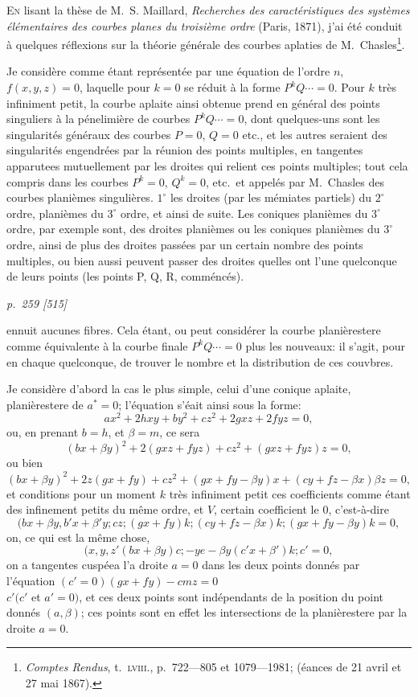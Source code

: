 \documentclass[11pt,a4paper]{article}
\theoremstyle{plain}
\theoremstyle{definition}
\begin{document}
\textsc{En} lisant la th\`ese de M.~S. Maillard, \textit{Recherches des caract\'eristiques des syst\`emes
\'el\'ementaires des courbes planes du troisi\`eme ordre} (Paris, 1871), j'ai \'et\'e conduit \`a
quelques r\'eflexions sur la th\'eorie g\'en\'erale des courbes aplaties de M.~Chasles\footnote{\textit{Comptes Rendus}, t.~\textsc{lviii.}, p.~722---805 et 1079---1981; (\'eances de 21 avril et 27 mai 1867).}.

Je consid\`ere comme \'etant repr\'esent\'ee par une \'equation de l'ordre $n$, $f(x, y, z) = 0$,
laquelle pour $k = 0$ se r\'eduit \`a la forme $P^kQ \cdots = 0$.  Pour $k$ tr\`es infiniment petit,
la courbe aplaite ainsi obtenue prend en g\'en\'eral des points singuliers \`a la p\'enelimi\`ere de
courbes $P^kQ \cdots = 0$, dont quelques-uns sont les singularit\'es g\'en\'eraux des courbes
$P = 0$, $Q = 0$ etc., et les autres seraient des singularit\'es engendr\'ees par la r\'eunion des
points multiples, en tangentes apparutees mutuellement par les droites qui relient ces
points multiples; tout cela compris dans les courbes $P^k = 0$, $Q^k = 0$, etc.\ et appel\'es par
M.~Chasles des courbes plani\`emes singuli\`eres.  $1^{\circ}$ les droites (par les m\'emiates partiels) du
$2^{\circ}$ ordre, plani\`emes du $3^{\circ}$ ordre, et ainsi de suite.  Les coniques plani\`emes du $3^{\circ}$ ordre,
par exemple sont, des droites plani\`emes ou les coniques plani\`emes du $3^{\circ}$ ordre, ainsi de plus
des droites pass\'ees par un certain nombre des points multiples, ou bien aussi peuvent
passer des droites quelles ont l'une quelconque de leurs points (les points P, Q, R, comm\'enc\'es).

\clearpage

\bigskip
\textit{p.~259 [515]}
\smallskip

\noindent
ennuit aucunes fibres.  Cela \'etant, ou peut consid\'erer la courbe plani\`erestere comme
\'equivalente \`a la courbe finale $P^kQ \cdots = 0$ plus les nouveaux: il s'agit, pour en
chaque quelconque, de trouver le nombre et la distribution de ces couvbres.

Je consid\`ere d'abord la cas le plus simple, celui d'une conique aplaite, plani\`erestere
de $a^* = 0$; l'\'equation s'\'eait ainsi sous la forme:
\[
ax^2 + 2hxy + by^2 + cz^2 + 2gxz + 2fyz = 0,
\]
ou, en prenant $b = h$, et $\beta = m$, ce sera
\[
(bx + \beta y)^2 + 2(gxz + fyz) + c z^2 + (gxz + fyz)z = 0,
\]
ou bien
\[
(bx + \beta y)^2 + 2z(gx + fy) + cz^2 + (gx + fy - \beta y)x + (cy + fz - \beta x)\beta z = 0,
\]
et conditions pour un moment $k$ tr\`es infiniment petit ces coefficients comme \'etant des infinement
petits du m\^eme ordre, et $V$, certain coefficient le $0$, c'est-\`a-dire
\[
(bx + \beta y, b' x + \beta' y; cz; (gx + fy)k; (cy + fz - \beta x)k; (gx + fy - \beta y)k = 0,
\]
on, ce qui est la m\^eme chose,
\[
(x, y, z'(bx + \beta y)c; -ye - \beta y(c'x + \beta')k; c' = 0,
\]
on a tangentes cusp\'eea l'a droite $a = 0$ dans les deux points donn\'es par l'\'equation
$(c' = 0)(gx + fy) - cmz = 0$ \\
$c'(c'$ et $a' = 0)$, et ces deux points sont ind\'ependants de la position
du point donn\'es $(a, \beta)$; ces points sont en effet les intersections de la plani\`erestere par
la droite $a = 0$.
\end{document}
